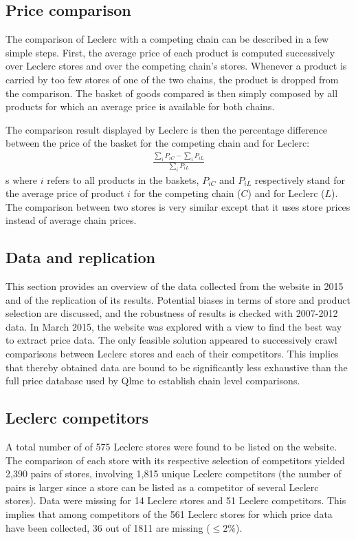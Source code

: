 \documentclass[english]{article}
\begin{document}
\subsection{Price comparison}

The comparison of Leclerc with a competing chain can be described in a few simple steps. First, the average price of each product is computed successively over Leclerc stores and over the competing chain's stores. Whenever a product is carried by too few stores of one of the two chains, the product is dropped from the comparison. The basket of goods compared is then simply composed by all products for which an average price is available for both chains.

The comparison result displayed by Leclerc is then the percentage difference between the price of the basket for the competing chain and for Leclerc:
\begin{align*}
\frac{\sum\limits_{i} P_{iC} - \sum\limits_{i} P_{iL}}{\sum\limits_{i} P_{iL}}
\end{align*}s
where $i$ refers to all products in the baskets, $P_{iC}$ and $P_{iL}$ respectively stand for the average price of product $i$ for the competing chain ($C$) and for Leclerc ($L$). The comparison between two stores is very similar except that it uses store prices instead of average chain prices.

\subsection{Data and replication}

This section provides an overview of the data collected from the website in 2015 and of the replication of its results. Potential biases in terms of store and product selection are discussed, and the robustness of results is checked with 2007-2012 data. In March 2015, the website was explored with a view to find the best way to extract price data. The only feasible solution appeared to successively crawl comparisons between Leclerc stores and each of their competitors. This implies that thereby obtained data are bound to be significantly less exhaustive than the full price database used by Qlmc to establish chain level comparisons.

\subsection{Leclerc competitors}

A total number of of 575 Leclerc stores were found to be listed on the website. The comparison of each store with its respective selection of competitors yielded 2,390 pairs of stores, involving 1,815 unique Leclerc competitors (the number of pairs is larger since a store can be listed as a competitor of several Leclerc stores). Data were missing for 14 Leclerc stores and 51 Leclerc competitors. This implies that among competitors of the 561 Leclerc stores for which price data have been collected, 36 out of 1811 are missing ($\le 2 \%$).
\end{document}
